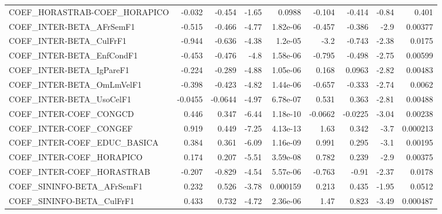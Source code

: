 \begin{tabular}{lrrrrrrrr}
COEF\_HORASTRAB-COEF\_HORAPICO          &      -0.032 &       -0.454 &   -1.65 &   0.0988 &     -0.104 &      -0.414 &        -0.84 &         0.401 \\
COEF\_INTER-BETA\_AFrSemF1              &      -0.515 &       -0.466 &   -4.77 & 1.82e-06 &     -0.457 &      -0.386 &         -2.9 &       0.00377 \\
COEF\_INTER-BETA\_CulFrF1               &      -0.944 &       -0.636 &   -4.38 &  1.2e-05 &       -3.2 &      -0.743 &        -2.38 &        0.0175 \\
COEF\_INTER-BETA\_EnfCondF1             &      -0.453 &       -0.476 &    -4.8 & 1.58e-06 &     -0.795 &      -0.498 &        -2.75 &       0.00599 \\
COEF\_INTER-BETA\_IgPareF1              &      -0.224 &       -0.289 &   -4.88 & 1.05e-06 &      0.168 &      0.0963 &        -2.82 &       0.00483 \\
COEF\_INTER-BETA\_OmLmVelF1             &      -0.398 &       -0.423 &   -4.82 & 1.44e-06 &     -0.657 &      -0.333 &        -2.74 &        0.0062 \\
COEF\_INTER-BETA\_UsoCelF1              &     -0.0455 &      -0.0644 &   -4.97 & 6.78e-07 &      0.531 &       0.363 &        -2.81 &       0.00488 \\
COEF\_INTER-COEF\_CONGCD                &       0.446 &        0.347 &   -6.44 & 1.18e-10 &    -0.0662 &     -0.0225 &        -3.04 &       0.00238 \\
COEF\_INTER-COEF\_CONGEF                &       0.919 &        0.449 &   -7.25 & 4.13e-13 &       1.63 &       0.342 &         -3.7 &      0.000213 \\
COEF\_INTER-COEF\_EDUC\_BASICA           &       0.384 &        0.361 &   -6.09 & 1.16e-09 &      0.991 &       0.295 &         -3.1 &       0.00195 \\
COEF\_INTER-COEF\_HORAPICO              &       0.174 &        0.207 &   -5.51 & 3.59e-08 &      0.782 &       0.239 &         -2.9 &       0.00375 \\
COEF\_INTER-COEF\_HORASTRAB             &      -0.207 &       -0.829 &   -4.54 & 5.57e-06 &     -0.763 &       -0.91 &        -2.37 &        0.0178 \\
COEF\_SININFO-BETA\_AFrSemF1            &       0.232 &        0.526 &   -3.78 & 0.000159 &      0.213 &       0.435 &        -1.95 &        0.0512 \\
COEF\_SININFO-BETA\_CulFrF1             &       0.433 &        0.732 &   -4.72 & 2.36e-06 &       1.47 &       0.823 &        -3.49 &      0.000487 \\

\end{tabular}
